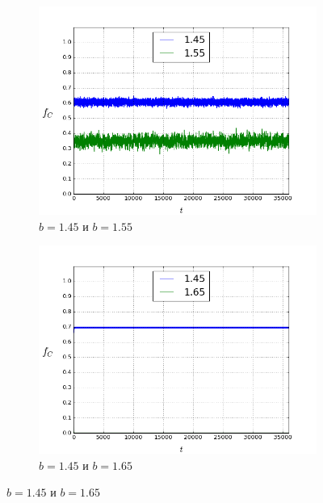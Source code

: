 \documentclass[a4paper]{article}
\begin{document}
\begin{figure}[H]
	\begin{subfigure}{.5\textwidth}
		\includegraphics[width=.8\linewidth]{145-155.png}
		\caption{$b=1.45$ и $b=1.55$}
	\end{subfigure}
	\begin{subfigure}{.5\textwidth}
		\includegraphics[width=.8\linewidth]{145-165.png}
		\caption{$b=1.45$ и $b=1.65$}
	\end{subfigure}%
\end{figure}
\end{document}
